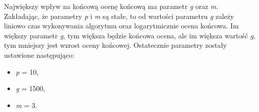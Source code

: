 Największy wpływ na końcową ocenę końcową ma parametr \textit{g} oraz \textit{m}. Zakładając, że parametry \textit{p} i \textit{m} są stałe, to od wartości parametru \textit{g} zależy liniowo czas wykonywania algorytmu oraz logarytmicznie ocena końcowa. Im większy parametr \textit{g}, tym większa będzie końcowa ocena, ale im większa wartość \textit{g}, tym mniejszy jest wzrost oceny końcowej. Ostatecznie parametry zostały ustawione następująco:
\begin{itemize}
	\item \textit{p} = 10,
	\item \textit{g} = 1500,
	\item \textit{m} = 3.
\end{itemize}